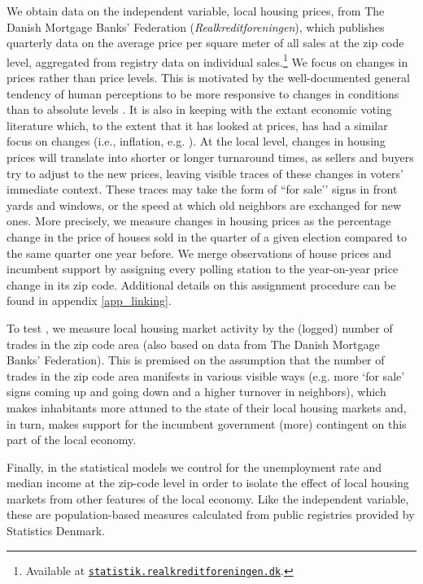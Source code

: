 \documentclass[12pt,a4paper]{article}
\begin{document}
	We obtain data on the independent variable, local housing prices, from The Danish Mortgage Banks' Federation (\textit{Realkreditforeningen}), which publishes quarterly data on the average price per square meter of all sales at the zip code level, aggregated from registry data on individual sales.\footnote{Available at \texttt{\href{http://statistik.realkreditforeningen.dk/}{statistik.realkreditforeningen.dk}}.} We focus on changes in prices rather than price levels. This is motivated by the well-documented general tendency of human perceptions to be more responsive to changes in conditions than to absolute levels \citep{kahneman1979prospect}. It is also in keeping with the extant economic voting literature which, to the extent that it has looked at prices, has had a similar focus on changes (i.e., inflation, e.g. \citealp{kramer1971short}). At the local level, changes in housing prices will translate into shorter or longer turnaround times, as sellers and buyers try to adjust to the new prices, leaving visible traces of these changes in voters’ immediate context. These traces may take the form of ``for sale’’ signs in front yards and windows, or the speed at which old neighbors are exchanged for new ones. More precisely, we measure changes in housing prices as the percentage change in the price of houses sold in the quarter of a given election compared to the same quarter one year before. We merge observations of house prices and incumbent support by assigning every polling station to the year-on-year price change in its zip code. Additional details on this assignment procedure can be found in appendix \ref{app_linking}.
	
	To test \htwo, we measure local housing market activity by the (logged) number of trades in the zip code area (also based on data from The Danish Mortgage Banks' Federation). This is premised on the assumption that the number of trades in the zip code area manifests in various visible ways (e.g. more ‘for sale’ signs coming up and going down and a higher turnover in neighbors), which makes inhabitants more attuned to the state of their local housing markets and, in turn, makes support for the incumbent government (more) contingent on this part of the local economy.
	
	Finally, in the statistical models we control for the unemployment rate and median income at the zip-code level in order to isolate the effect of local housing markets from other features of the local economy. Like the independent variable, these are population-based measures calculated from public registries provided by Statistics Denmark.
	
\end{document}
